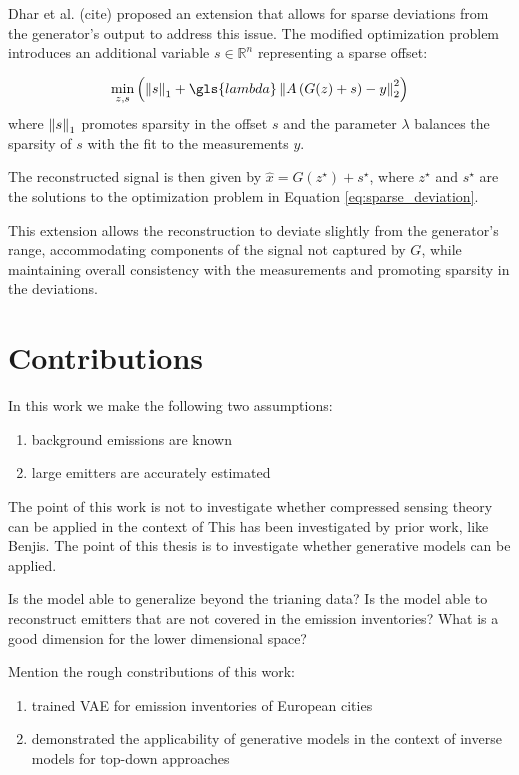 Dhar et al. (cite) proposed an extension that allows for sparse deviations from the generator's output to address this issue.
The modified optimization problem introduces an additional variable $s \in \mathbb{R}^n$ representing a sparse offset:

\begin{equation}
 \min_{z, s}{\left(\norm{s}_1 + \gls{lambda} \norm{A \left( G(z) + s \right) - y}_2^2 \right)}
    \label{eq:sparse_deviation}
\end{equation}
where $\left\lVert s\right\rVert_1$ promotes sparsity in the offset $s$ and the parameter $\lambda$ balances the sparsity of $s$ with the fit to the measurements $y$.

The reconstructed signal is then given by $\hat{x} = G(z^\star) + s^\star$, where $z^\star$ and $s^\star$ are the solutions to the optimization problem in Equation \ref{eq:sparse_deviation}.

This extension allows the reconstruction to deviate slightly from the generator's range, accommodating components of the signal not captured by $G$, while maintaining overall consistency with the measurements and promoting sparsity in the deviations.

\section{Contributions}
In this work we make the following two assumptions:
\begin{enumerate}
    \item background emissions are known
    \item large emitters are accurately estimated
\end{enumerate}

The point of this work is not to investigate whether compressed sensing theory can be applied in the context of 
This has been investigated by prior work, like Benjis.
The point of this thesis is to investigate whether generative models can be applied.

Is the model able to generalize beyond the trianing data?
Is the model able to reconstruct emitters that are not covered in the emission inventories? 
What is a good dimension for the lower dimensional space?

Mention the rough constributions of this work:
\begin{enumerate}
    \item trained VAE for emission inventories of European cities
    \item demonstrated the applicability of generative models in the context of inverse models for top-down approaches
\end{enumerate}


